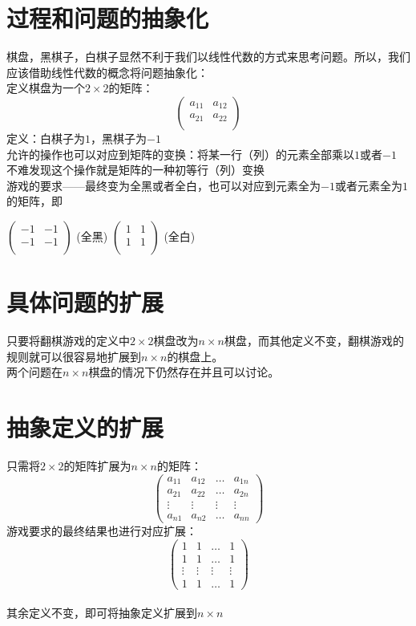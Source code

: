 \documentclass[UTF-8,a4paper]{ctexart}
\begin{document}
\section{过程和问题的抽象化}
\songti
棋盘，黑棋子，白棋子显然不利于我们以线性代数的方式来思考问题。所以，我们应该借助线性代数的概念将问题抽象化： 
\kaishu
\\定义棋盘为一个\(2 \times 2\)的矩阵：
\[\begin{pmatrix}
    a_{11}&a_{12}\\
    a_{21}&a_{22}\\
\end{pmatrix}\]
\quad
定义：白棋子为\(1\)，黑棋子为\(-1\)
\\允许的操作也可以对应到矩阵的变换：将某一行（列）的元素全部乘以\(1\)或者\(-1\)
\\不难发现这个操作就是矩阵的一种初等行（列）变换
\\游戏的要求——最终变为全黑或者全白，也可以对应到元素全为\(-1\)或者元素全为\(1\)的矩阵，即\\
\begin{center}
\(\begin{pmatrix}
    -1&-1\\
    -1&-1\\
\end{pmatrix}\)
\quad
(全黑)
\(\begin{pmatrix}
    1&1\\
    1&1\\
\end{pmatrix}\)
\quad
(全白)
\end{center}


\section{具体问题的扩展}
只要将翻棋游戏的定义中\(2 \times 2\)棋盘改为\(n \times n\)棋盘，而其他定义不变，翻棋游戏的规则就可以很容易地扩展到\(n \times n\)的棋盘上。 \\
两个问题在\(n \times n\)棋盘的情况下仍然存在并且可以讨论。
\section{抽象定义的扩展}
只需将\(2 \times 2\)的矩阵扩展为\(n \times n\)的矩阵：
\[\begin{pmatrix}
    a_{11}&a_{12}&\dots&a_{1n}
    \\a_{21}&a_{22}&\dots&a_{2n}
    \\ \vdots &\vdots &\vdots &\vdots
    \\a_{n1}&a_{n2}&\dots&a_{nn}
\end{pmatrix}\]
游戏要求的最终结果也进行对应扩展：
\[\begin{pmatrix}
    1&1&\dots&1
    \\1&1&\dots&1
    \\ \vdots &\vdots &\vdots &\vdots
    \\1&1&\dots&1
\end{pmatrix}\]
\\其余定义不变，即可将抽象定义扩展到\(n \times n\)
\end{document}
